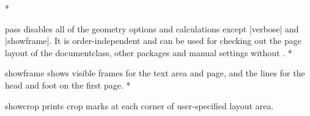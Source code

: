 \begin{Options}
\switchcolumn
\switchcolumn[0]*\item[\onlypre pass] disables all of the geometry options and calculations
  except |verbose| and |showframe|. It is order-independent and can be
  used for checking out the page layout of the documentclass, other
  packages and manual settings without \Gm.
\switchcolumn
\switchcolumn[0]*\item[\onlypre showframe] shows visible frames for the text area and page,
  and the lines for the head and foot on the first page.
\switchcolumn
\switchcolumn[0]*\item[\onlypre showcrop] prints crop marks at each corner of user-specified
layout area.
\end{Options}
